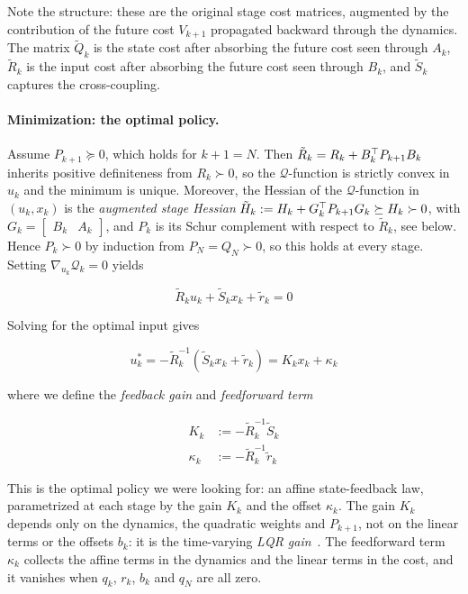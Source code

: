 Note the structure:
these are the original stage cost matrices, augmented by the contribution of the future cost $V_{k+1}$ propagated backward through the dynamics.
The matrix $\tilde{Q}_k$ is the state cost after absorbing the future cost seen through $A_k$, $\tilde{R}_k$ is the input cost after absorbing the future cost seen through $B_k$, and $\tilde{S}_k$ captures the cross-coupling.

\paragraph{Minimization: the optimal policy.}
Assume $P_{k+1} \succeq 0$, which holds for $k+1 = N$.
Then $\tilde{R}_k = R_k + B_k^\top P_{k+1} B_k$ inherits positive definiteness from $R_k \succ 0$, so the $\mathcal{Q}$-function is strictly convex in $u_k$ and the minimum is unique.
Moreover, the Hessian of the $\mathcal{Q}$-function in $(u_k, x_k)$ is the \textit{augmented stage Hessian} $\tilde{H}_k := H_k + G_k^\top P_{k+1} G_k \succeq H_k \succ 0$, with $G_k = \begin{bmatrix} B_k & A_k \end{bmatrix}$, and $P_k$ is its Schur complement with respect to $\tilde{R}_k$, see below.
Hence $P_k \succ 0$ by induction from $P_N = Q_N \succ 0$, so this holds at every stage.
Setting $\nabla_{u_k} \mathcal{Q}_k = 0$ yields

\[
\tilde{R}_k u_k + \tilde{S}_k x_k + \tilde{r}_k = 0
\]

Solving for the optimal input gives

\begin{equation} \label{eq:optimal_policy}
u_k^* = - \tilde{R}_k^{-1} \left( \tilde{S}_k x_k + \tilde{r}_k \right) = K_k x_k + \kappa_k
\end{equation}

where we define the \textit{feedback gain} and \textit{feedforward term}

\begin{align}
K_k &:= -\tilde{R}_k^{-1} \tilde{S}_k \label{eq:gain} \\
\kappa_k &:= -\tilde{R}_k^{-1} \tilde{r}_k \label{eq:feedforward}
\end{align}

This is the optimal policy we were looking for: an affine state-feedback law, parametrized at each stage by the gain $K_k$ and the offset $\kappa_k$.
The gain $K_k$ depends only on the dynamics, the quadratic weights and $P_{k+1}$, not on the linear terms or the offsets $b_k$: it is the time-varying \textit{LQR gain}~\cite{kalman1960contributions}.
The feedforward term $\kappa_k$ collects the affine terms in the dynamics and the linear terms in the cost, and it vanishes when $q_k$, $r_k$, $b_k$ and $q_N$ are all zero.

